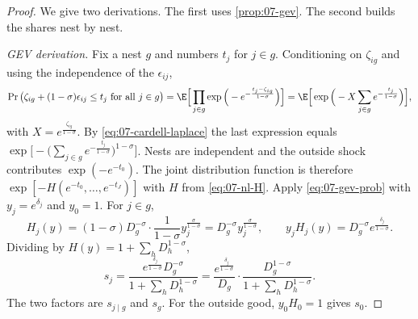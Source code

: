 \begin{proof}
We give two derivations. The first uses \cref{prop:07-gev}. The second builds the shares nest by nest.

\emph{GEV derivation.} Fix a nest $g$ and numbers $t_j$ for $j \in g$. Conditioning on $\zeta_{ig}$ and using the
independence of the $\epsilon_{ij}$,
\begin{equation*}
\Pr\big(\zeta_{ig} + (1-\sigma)\epsilon_{ij} \le t_j \text{ for all } j \in g\big)
= \E\Big[\prod_{j\in g}\exp\Big(-e^{-\frac{t_j - \zeta_{ig}}{1-\sigma}}\Big)\Big]
= \E\Big[\exp\Big(-X\sum_{j \in g}e^{-\frac{t_j}{1-\sigma}}\Big)\Big],
\end{equation*}
with $X = e^{\frac{\zeta_{ig}}{1-\sigma}}$. By \eqref{eq:07-cardell-laplace} the last expression equals
$\exp\big[-\big(\sum_{j\in g}e^{-\frac{t_j}{1-\sigma}}\big)^{1-\sigma}\big]$. Nests are independent and the outside
shock contributes $\exp(-e^{-t_0})$. The joint distribution function is therefore $\exp[-H(e^{-t_0}, \dots,
e^{-t_J})]$ with $H$ from \eqref{eq:07-nl-H}. Apply \eqref{eq:07-gev-prob} with $y_j = e^{\delta_j}$ and
$y_0 = 1$. For $j \in g$,
\begin{equation*}
H_j(y) = (1-\sigma)D_g^{-\sigma}\cdot\frac{1}{1-\sigma}y_j^{\frac{\sigma}{1-\sigma}} = D_g^{-\sigma}y_j^{\frac{\sigma}{1-\sigma}},
\qquad y_jH_j(y) = D_g^{-\sigma}e^{\frac{\delta_j}{1-\sigma}} .
\end{equation*}
Dividing by $H(y) = 1 + \sum_h D_h^{1-\sigma}$,
\begin{equation*}
s_j = \frac{e^{\frac{\delta_j}{1-\sigma}}D_g^{-\sigma}}{1 + \sum_h D_h^{1-\sigma}}
= \frac{e^{\frac{\delta_j}{1-\sigma}}}{D_g}\cdot\frac{D_g^{1-\sigma}}{1 + \sum_h D_h^{1-\sigma}} .
\end{equation*}
The two factors are $s_{j \mid g}$ and $s_g$. For the outside good, $y_0H_0 = 1$ gives $s_0$.


\end{proof}
